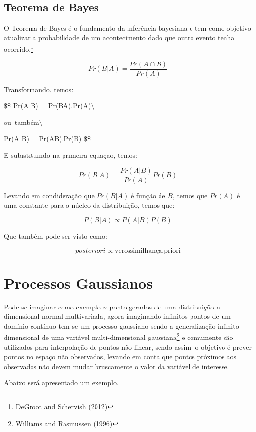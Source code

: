 \documentclass[
	12pt,				%
	a4paper,		%
	oneside,    %
	chapter=TITLE,		   %
	section=TITLE,		   %
	subsection=TITLE,	   %
	subsubsection=TITLE, %
	english,			%
	french,				%
	spanish,			%
	brazil,				%
]{abntex2}
\begin{document}
\hypertarget{teorema-de-bayes}{%
\subsection{Teorema de Bayes}\label{teorema-de-bayes}}

O Teorema de Bayes é o fundamento da inferência bayesiana e tem como
objetivo atualizar a probabilidade de um acontecimento dado que outro
evento tenha ocorrido.\footnote{DeGroot and Schervish (2012)}

\[
Pr(B|A) = \frac{Pr(A \cap B)}{Pr(A)}
\]

Transformando, temos:

\$\$ Pr(A \cap B) = Pr(B\textbar{}A).Pr(A)\textbackslash{}

\mbox{ou também}\textbackslash{}

Pr(A \cap B) = Pr(A\textbar{}B).Pr(B) \$\$

E subistituindo na primeira equação, temos:

\[
Pr(B|A) = \frac{Pr(A|B)}{Pr(A)}Pr(B)
\]

Levando em condideração que \(Pr(B|A)\) é função de \(B\), temos que
\(Pr(A)\) é uma constante para o núcleo da distribuição, temos que:

\[
P(B|A) \propto P(A|B)P(B)
\]

Que também pode ser visto como:

\[
posteriori \propto \mbox{verossimilhança}.\mbox{priori}
\]

\hypertarget{processos-gaussianos}{%
\section{Processos Gaussianos}\label{processos-gaussianos}}

Pode-se imaginar como exemplo \(n\) ponto gerados de uma distribuição
n-dimensional normal multivariada, agora imaginando infinitos pontos de
um domínio contínuo tem-se um processo gaussiano sendo a generalização
infinito-dimensional de uma variável multi-dimensional
gaussiana\footnote{Williams and Rasmussen (1996)} e comumente são
utilizados para interpolação de pontos não linear, sendo assim, o
objetivo é prever pontos no espaço não observados, levando em conta que
pontos próximos aos observados não devem mudar bruscamente o valor da
variável de interesse.

Abaixo será apresentado um exemplo.
\end{document}
